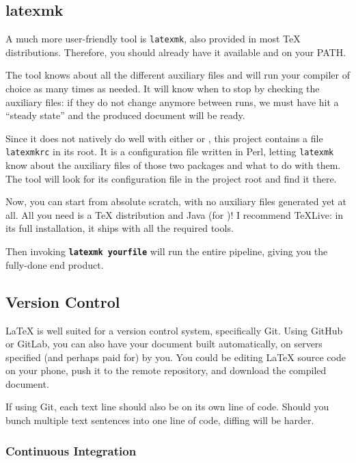 \subsection{latexmk}
A much more user-friendly tool is \texttt{latexmk}, also provided in most \TeX{} distributions.
Therefore, you should already have it available and on your PATH.

The tool knows about all the different auxiliary files and will run your compiler of choice as many times as needed.
It will know when to stop by checking the auxiliary files: if they do not change anymore between runs, we must have hit a \enquote{steady state} and the produced document will be ready.

Since it does not natively do well with either  or , this project contains a file \texttt{latexmkrc} in its root.
It is a configuration file written in Perl, letting \texttt{latexmk} know about the auxiliary files of those two packages and what to do with them.
The tool will look for its configuration file in the project root and find it there.

Now, you can start from absolute scratch, with no auxiliary files generated yet at all.
All you need is a \TeX{} distribution and Java (for )!
I recommend TeXLive: in its full installation, it ships with all the required tools.

Then invoking \textbf{\texttt{latexmk yourfile}} will run the entire pipeline, giving you the fully-done end product.

\subsection{Version Control}
\LaTeX{} is well suited for a version control system, specifically Git.
Using GitHub or GitLab, you can also have your document built automatically, on servers specified (and perhaps paid for) by you.
You could be editing \LaTeX{} source code on your phone, push it to the remote repository, and download the compiled document.

If using Git, each text line should also be on its own line of code.
Should you bunch multiple text sentences into one line of code, diffing will be harder.

\subsubsection{Continuous Integration}

